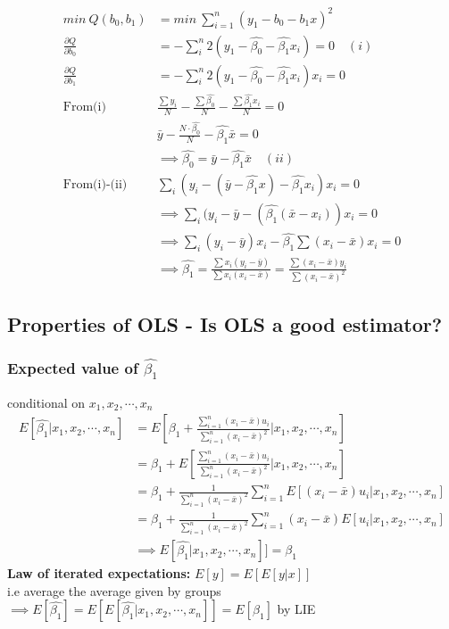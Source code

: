 \documentclass{article}
\theoremstyle{definition}
\theoremstyle{thrm}
\theoremstyle{lma}
\theoremstyle{ppst}
\theoremstyle{crlr}
\begin{document}
\begin{align*}
	min \ Q(b_0,b_1) &= min \ \sum_{i=1}^n(y_1-b_0-b_1x)^2\\
	\frac{\partial Q}{\partial b_0} &= -\sum_i^n2(y_1-\hat{\beta_0}-\hat{\beta_1}x_i) = 0 \quad(i)\\
	\frac{\partial Q}{\partial b_1} &= -\sum_i^n2(y_1-\hat{\beta_0}-\hat{\beta_1}x_i)x_i = 0\\
	\text{From(i) } &\frac{\sum y_i}{N}-\frac{\sum\hat{\beta_0}}{N} - \frac{\sum\hat{\beta_1}x_i}{N} =0\\
	& \bar{y} -\frac{N\cdot \hat{\beta_0}}{N}-\hat{\beta_1}\bar{x} = 0\\
	& \implies \hat{\beta_0} = \bar{y}-\hat{\beta_1}\bar{x}\quad (ii)\\
	\text{From(i)-(ii)} & \sum_i(y_i-(\bar{y}-\hat{\beta_1}x)-\hat{\beta_1}x_i)x_i=0\\
	&\implies \sum_i(y_i-\bar{y}-(\hat{\beta_1}(\bar{x}-x_i))x_i=0\\
	&\implies \sum_i(y_i-\bar{y})x_i-\hat{\beta_1}\sum(x_i-\bar{x})x_i=0\\
	&\implies \hat{\beta_1} = \frac{\sum x_i(y_i-\bar{y})}{\sum x_i(x_i-\bar{x})} = \frac{\sum(x_i-\bar{x})y_i}{\sum(x_i-\bar{x})^2}
\end{align*}
\subsection{Properties of OLS - Is OLS a good estimator?}
\subsubsection{Expected value of $\hat{\beta_1}$}
conditional on $x_1,x_2,\cdots, x_n$
\begin{align*}
	E[\hat{\beta_1}|x_1,x_2,\cdots, x_n] &= E[\beta_1+\frac{\sum_{i=1}^n(x_i-\bar{x})u_i}{\sum_{i=1}^n(x_i-\bar{x})^2}|x_1,x_2,\cdots, x_n]\\
	&=\beta_1 + E[\frac{\sum_{i=1}^n(x_i-\bar{x})u_i}{\sum_{i=1}^n(x_i-\bar{x})^2}|x_1,x_2,\cdots, x_n]\\
	&=\beta_1+\frac{1}{\sum_{i=1}^n(x_i-\bar{x})^2}\sum_{i=1}^nE[(x_i-\bar{x})u_i|x_1,x_2,\cdots, x_n]\\
	&=\beta_1+\frac{1}{\sum_{i=1}^n(x_i-\bar{x})^2}\sum_{i=1}^n(x_i-\bar{x})E[u_i|x_1,x_2,\cdots, x_n]\\
	&\implies E[\hat{\beta_1}|x_1,x_2,\cdots, x_n]] = \beta_1
\end{align*}
\textbf{Law of iterated expectations: } $E[y] = E[E[y|x]]$\\
i.e average the average given by groups $\implies E[\hat{\beta_1}] = E[E[\hat{\beta_1}|x_1,x_2,\cdots, x_n]] = E[\beta_1]$ by LIE
\end{document}
